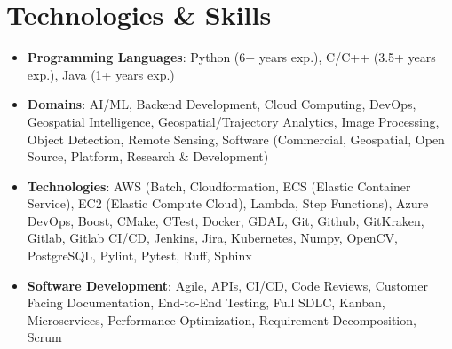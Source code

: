 \documentclass[letterpaper,10pt]{article}
\makeatletter
\newcommand{\resumeAwardItem}[3]{
  \item
    \begin{tabular*}{0.97\textwidth}{l@{\extracolsep{\fill}}r}
      \textbf{#1} \textit{\small #2} & \textit{\small #3} \\
    \end{tabular*}
}
\newcommand{\resumeSubHeadingListStart}{\begin{itemize}[leftmargin=*]}
\newcommand{\resumeSubHeadingListEnd}{\end{itemize}}
\makeatother
\begin{document}
\section{Technologies \& Skills}
 \resumeSubHeadingListStart
   \item\small{
     \textbf{Programming Languages}{:
      Python (6+ years exp.),
      C/C++ (3.5+ years exp.),
      Java (1+ years exp.)
     }
   }
   \item\small{
    \textbf{Domains}{:
      AI/ML,
      Backend Development,
      Cloud Computing,
      DevOps,
      Geospatial Intelligence,
      Geospatial/Trajectory Analytics,
      Image Processing,
      Object Detection,
      Remote Sensing,
      Software (Commercial, Geospatial, Open Source, Platform, Research \& Development)
    }
   }
   \item\small{
    \textbf{Technologies}{:
      AWS (Batch, Cloudformation, ECS (Elastic Container Service), EC2 (Elastic Compute Cloud), Lambda, Step Functions),
      Azure DevOps,
      Boost,
      CMake,
      CTest,
      Docker,
      GDAL,
      Git,
      Github,
      GitKraken,
      Gitlab,
      Gitlab CI/CD,
      Jenkins,
      Jira,
      Kubernetes,
      Numpy,
      OpenCV,
      PostgreSQL,
      Pylint,
      Pytest,
      Ruff,
      Sphinx
    }
   }
   \item\small{
    \textbf{Software Development}{:
      Agile,
      APIs,
      CI/CD,
      Code Reviews,
      Customer Facing Documentation,
      End-to-End Testing,
      Full SDLC,
      Kanban,
      Microservices,
      Performance Optimization,
      Requirement Decomposition,
      Scrum
    }
   }
 \resumeSubHeadingListEnd



\end{document}
